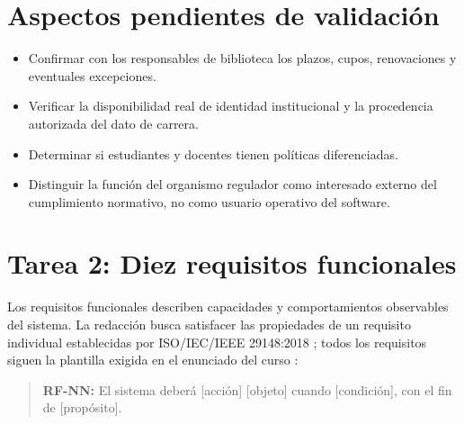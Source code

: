 \documentclass[conference,onecolumn]{IEEEtran}
\begin{document}
\section{Aspectos pendientes de validación}
\begin{itemize}
\item Confirmar con los responsables de biblioteca los plazos, cupos, renovaciones y eventuales excepciones.
\item Verificar la disponibilidad real de identidad institucional y la procedencia autorizada del dato de carrera.
\item Determinar si estudiantes y docentes tienen políticas diferenciadas.
\item Distinguir la función del organismo regulador como interesado externo del cumplimiento normativo, no como usuario operativo del software.
\end{itemize}

\section{Tarea 2: Diez requisitos funcionales}
Los requisitos funcionales describen capacidades y comportamientos observables del sistema. La redacción busca satisfacer las propiedades de un requisito individual establecidas por ISO/IEC/IEEE 29148:2018 \cite{ieee29148}; todos los requisitos siguen la plantilla exigida en el enunciado del curso \cite{uteqsemana1}:

\begin{quote}
\textbf{RF-NN:} El sistema deberá [acción] [objeto] cuando [condición], con el fin de [propósito].
\end{quote}
\end{document}
